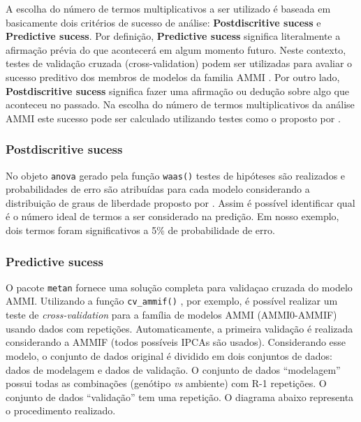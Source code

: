 \documentclass[
]{book}
\begin{document}
A escolha do número de termos multiplicativos a ser utilizado é baseada em basicamente dois critérios de sucesso de análise: \textbf{Postdiscritive sucess} e \textbf{Predictive sucess}. Por definição, \textbf{Predictive sucess} significa literalmente a afirmação prévia do que acontecerá em algum momento futuro. Neste contexto, testes de validação cruzada (cross-validation) podem ser utilizadas para avaliar o sucesso preditivo dos membros de modelos da familia AMMI \citep{Olivoto2019}. Por outro lado, \textbf{Postdiscritive sucess} significa fazer uma afirmação ou dedução sobre algo que aconteceu no passado. Na escolha do número de termos multiplicativos da análise AMMI este sucesso pode ser calculado utilizando testes como o proposto por \citet{Gollob1968}.

\hypertarget{postdiscritive-sucess}{%
\subsubsection{Postdiscritive sucess}\label{postdiscritive-sucess}}


No objeto \texttt{anova}  gerado pela função \texttt{waas()}  testes de hipóteses são realizados e probabilidades de erro são atribuídas para cada modelo considerando a distribuição de graus de liberdade proposto por \citet{Gollob1968}. Assim é possível identificar qual é o número ideal de termos a ser considerado na predição. Em nosso exemplo, dois termos foram significativos a 5\% de probabilidade de erro.

\hypertarget{predictive-sucess}{%
\subsubsection{Predictive sucess}\label{predictive-sucess}}


O pacote \texttt{metan} fornece uma solução completa para validaçao cruzada do modelo AMMI. Utilizando a função \texttt{cv\_ammif()} , por exemplo, é possível realizar um teste de \emph{cross-validation} para a família de modelos AMMI (AMMI0-AMMIF) usando dados com repetições. Automaticamente, a primeira validação é realizada considerando a AMMIF (todos possíveis IPCAs são usados). Considerando esse modelo, o conjunto de dados original é dividido em dois conjuntos de dados: dados de modelagem e dados de validação. O conjunto de dados ``modelagem'' possui todas as combinações (genótipo \emph{vs} ambiente) com R-1 repetições. O conjunto de dados ``validação'' tem uma repetição. O diagrama abaixo representa o procedimento realizado.
\end{document}
